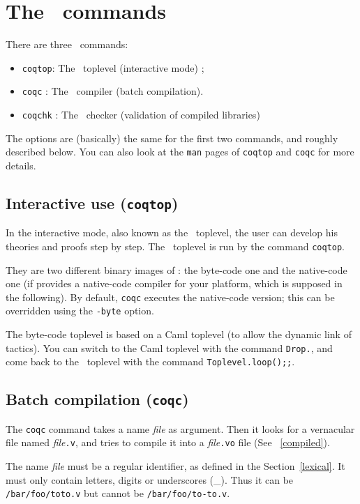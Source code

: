 \chapter[The \Coq~commands]{The \Coq~commands\label{Addoc-coqc}
}

There are three \Coq~commands: 
\begin{itemize}
\item {\tt coqtop}: The \Coq\ toplevel (interactive mode) ; 
\item {\tt coqc} : The \Coq\ compiler (batch compilation).
\item {\tt coqchk} : The \Coq\ checker (validation of compiled libraries)
\end{itemize}
The options are (basically) the same for the first two commands, and
roughly described below. You can also look at the \verb!man! pages of
\verb!coqtop! and \verb!coqc! for more details.


\section{Interactive use ({\tt coqtop})}

In the interactive mode, also known as the \Coq~toplevel, the user can
develop his theories and proofs step by step.  The \Coq~toplevel is
run by the command {\tt coqtop}. 

\label{binary-images}
They are two different binary images of \Coq: the byte-code one and
the native-code one (if {\ocaml} provides a native-code compiler
for your platform, which is supposed in the following). By default,
\verb!coqc! executes the native-code version; this can be overridden
using the \verb!-byte! option.

The byte-code toplevel is based on a Caml
toplevel (to allow the dynamic link of tactics).  You can switch to
the Caml toplevel with the command \verb!Drop.!, and come back to the
\Coq~toplevel with the command \verb!Toplevel.loop();;!.

\section{Batch compilation ({\tt coqc})}
The {\tt coqc} command takes a name {\em file} as argument.  Then it
looks for a vernacular file named {\em file}{\tt .v}, and tries to
compile it into a {\em file}{\tt .vo} file (See ~\ref{compiled}).

\Warning The name {\em file} must be a regular {\Coq} identifier, as
defined in the Section~\ref{lexical}. It
must only contain letters, digits or underscores
(\_). Thus it can be \verb+/bar/foo/toto.v+ but cannot be
\verb+/bar/foo/to-to.v+.

